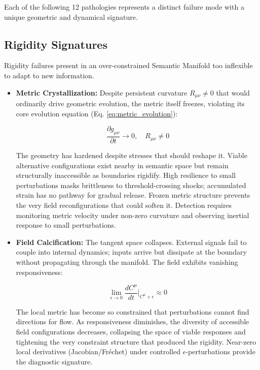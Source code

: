 Each of the following 12 pathologies represents a distinct failure mode with a unique geometric and dynamical signature.


\subsection{Rigidity Signatures}
\label{16.2.1:rigidity_signatures}

Rigidity failures present in an over-constrained Semantic Manifold too inflexible to adapt to new information.

\begin{itemize}
    
    \item \textbf{Metric Crystallization:} Despite persistent curvature \(R_{\mu\nu} \neq 0\) that would ordinarily drive geometric evolution, the metric itself freezes, violating its core evolution equation (Eq. \ref{eq:metric_evolution}):

    \begin{equation}
    \frac{\partial g_{\mu\nu}}{\partial t} \to 0, \quad R_{\mu\nu} \neq 0
    \end{equation}

    The geometry has hardened despite stresses that should reshape it. Viable alternative configurations exist nearby in semantic space but remain structurally inaccessible as boundaries rigidify. High resilience to small perturbations masks brittleness to threshold-crossing shocks; accumulated strain has no pathway for gradual release. Frozen metric structure prevents the very field reconfigurations that could soften it. Detection requires monitoring metric velocity under non-zero curvature and observing inertial response to small perturbations.
    
    \item \textbf{Field Calcification:} The tangent space collapses. External signals fail to couple into internal dynamics; inputs arrive but dissipate at the boundary without propagating through the manifold. The field exhibits vanishing responsiveness:

    \begin{equation}
    \lim_{\epsilon \to 0} \frac{dC^\mu}{dt}\bigg|_{C^\mu+\epsilon} \approx 0
    \end{equation}

    The local metric has become so constrained that perturbations cannot find directions for flow. As responsiveness diminishes, the diversity of accessible field configurations decreases, collapsing the space of viable responses and tightening the very constraint structure that produced the rigidity. Near-zero local derivatives (Jacobian/Fréchet) under controlled \(\epsilon\)-perturbations provide the diagnostic signature.
    

\end{itemize}
